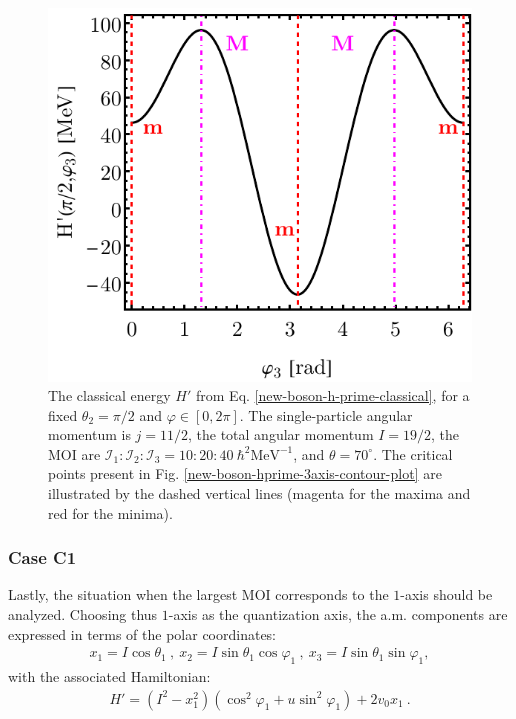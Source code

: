 \begin{figure}
    \begin{center}
        \includegraphics[scale=0.8]{Chapters/Figures/New-Boson-Classical-H-3-axis-varphi-plot.pdf}
        \caption{The classical energy $H'$ from Eq. \ref{new-boson-h-prime-classical}, for a fixed $\theta_2=\pi/2$ and $\varphi\in[0,2\pi]$. The single-particle angular momentum is $j=11/2$, the total angular momentum $I=19/2$, the MOI are $\mathcal{I}_1:\mathcal{I}_2:\mathcal{I}_3=10:20:40\ \hbar^2\text{MeV}^{-1}$, and $\theta=70^\circ$. The critical points present in Fig. \ref{new-boson-hprime-3axis-contour-plot} are illustrated by the dashed vertical lines (magenta for the maxima and red for the minima).}
        \label{new-boson-hprime-3axis-varphi-plot}
    \end{center}
\end{figure}

\subsubsection*{Case C1}

Lastly, the situation when the largest MOI corresponds to the $1$-axis should be analyzed. Choosing thus $1$-axis as the quantization axis, the a.m. components are expressed in terms of the polar coordinates:
\begin{align}
    x_1=I\cos\theta_1\ ,\ x_2=I\sin\theta_1\cos\varphi_1\ ,\ x_3=I\sin\theta_1\sin\varphi_1,
    \label{polar-coordinates-case-c1}
\end{align}
with the associated Hamiltonian:
\begin{align}
    H'=\left(I^2-x_1^2\right)\left(\cos^2\varphi_1+u\sin^2\varphi_1\right)+2v_0x_1\ .
    \label{classical-energy-new-boson-1-axis}
\end{align}

